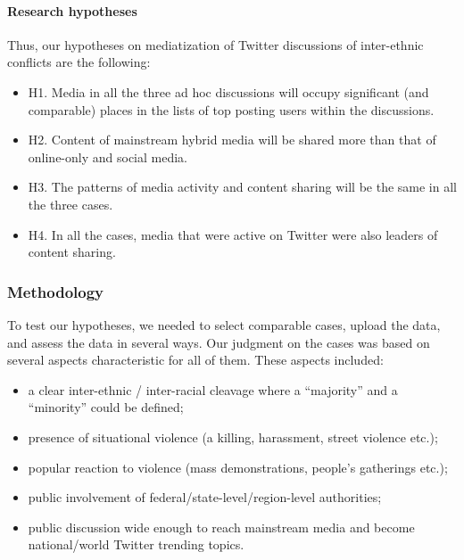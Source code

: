 \paragraph{Research hypotheses}
Thus, our hypotheses on mediatization of Twitter discussions of inter-ethnic conflicts are the following:
\begin{itemize}
	\item H1. Media in all the three ad hoc discussions will occupy significant (and comparable) places in the lists of top posting users within the discussions.
	\item H2. Content of mainstream hybrid media will be shared more than that of online-only and social media.
	\item H3. The patterns of media activity and content sharing will be the same in all the three cases.
	\item H4. In all the cases, media that were active on Twitter were also leaders of content sharing.
\end{itemize}

\subsubsection{Methodology}
To test our hypotheses, we needed to select comparable cases, upload the data, and assess the data in several ways. Our judgment on the cases was based on several aspects characteristic for all of them. These aspects included:
\begin{itemize}
	\item a clear inter-ethnic / inter-racial cleavage where a “majority” and a “minority” could be defined;
	\item presence of situational violence (a killing, harassment, street violence etc.);
	\item popular reaction to violence (mass demonstrations, people’s gatherings etc.);
	\item public involvement of federal/state-level/region-level authorities;
	\item public discussion wide enough to reach mainstream media and become national/world Twitter trending topics.
\end{itemize}

